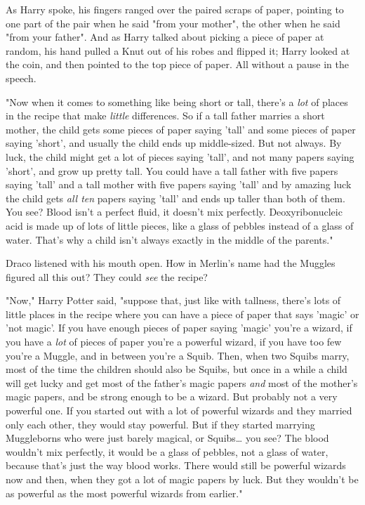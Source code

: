 As Harry spoke, his fingers ranged over the paired scraps of paper, pointing to 
one part of the pair when he said "from your mother", the other when he said 
"from your father". And as Harry talked about picking a piece of paper at 
random, his hand pulled a Knut out of his robes and flipped it; Harry looked at 
the coin, and then pointed to the top piece of paper. All without a pause in 
the speech.

"Now when it comes to something like being short or tall, there's a \emph{lot} 
of places in the recipe that make \emph{little} differences. So if a tall 
father marries a short mother, the child gets some pieces of paper saying 
'tall' and some pieces of paper saying 'short', and usually the child ends up 
middle-sized. But not always. By luck, the child might get a lot of pieces 
saying 'tall', and not many papers saying 'short', and grow up pretty tall. You 
could have a tall father with five papers saying 'tall' and a tall mother with 
five papers saying 'tall' and by amazing luck the child gets \emph{all ten} 
papers saying 'tall' and ends up taller than both of them. You see? Blood isn't 
a perfect fluid, it doesn't mix perfectly. Deoxyribonucleic acid is made up of 
lots of little pieces, like a glass of pebbles instead of a glass of water. 
That's why a child isn't always exactly in the middle of the parents."

Draco listened with his mouth open. How in Merlin's name had the Muggles 
figured all this out? They could \emph{see} the recipe?

"Now," Harry Potter said, "suppose that, just like with tallness, there's lots 
of little places in the recipe where you can have a piece of paper that says 
'magic' or 'not magic'. If you have enough pieces of paper saying 'magic' 
you're a wizard, if you have a \emph{lot} of pieces of paper you're a powerful 
wizard, if you have too few you're a Muggle, and in between you're a Squib. 
Then, when two Squibs marry, most of the time the children should also be 
Squibs, but once in a while a child will get lucky and get most of the father's 
magic papers \emph{and} most of the mother's magic papers, and be strong enough 
to be a wizard. But probably not a very powerful one. If you started out with a 
lot of powerful wizards and they married only each other, they would stay 
powerful. But if they started marrying Muggleborns who were just barely 
magical, or Squibs{\ldots} you see? The blood wouldn't mix perfectly, it would 
be a glass of pebbles, not a glass of water, because that's just the way blood 
works. There would still be powerful wizards now and then, when they got a lot 
of magic papers by luck. But they wouldn't be as powerful as the most powerful 
wizards from earlier."

